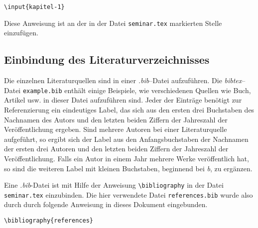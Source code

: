 \texttt{\textbackslash input\{kapitel-1\}}

Diese Anweisung ist an der in der Datei \texttt{seminar.tex} markierten Stelle einzufügen. 
%
\subsection{Einbindung des Literaturverzeichnisses}
%
Die einzelnen Literaturquellen sind in einer \textit{.bib}--Datei aufzuführen. Die \textit{bibtex}--Datei \texttt{example.bib} enthält einige Beispiele, wie
verschiedenen Quellen wie Buch, Artikel usw. in dieser Datei aufzuführen sind. Jeder der
Einträge benötigt zur Referenzierung ein eindeutiges Label, das sich aus den ersten drei
Buchstaben des Nachnamen des Autors und den letzten beiden Ziffern der Jahreszahl der
Veröffentlichung ergeben. Sind mehrere Autoren bei einer Literaturquelle aufgeführt, so
ergibt sich der Label aus den Anfangsbuchstaben der Nachnamen der ersten drei Autoren
und den letzten beiden Ziffern der Jahreszahl der Veröffentlichung. Falls ein Autor in einem
Jahr mehrere Werke veröffentlich hat, so sind die weiteren Label mit kleinen Buchstaben,
beginnend bei \textit{b}, zu ergänzen.

Eine \textit{.bib}-Datei ist mit Hilfe der Anweisung \texttt{\textbackslash bibliography} in der Datei \texttt{seminar.tex} einzubinden.
Die hier verwendete Datei \texttt{references.bib} wurde also durch durch folgende Anweisung
in dieses Dokument eingebunden.

\texttt{\textbackslash bibliography\{references\}}